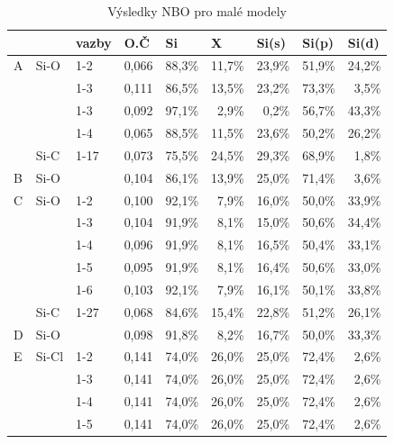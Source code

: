\documentclass[
  digital, %
  table,   %
  lof,     %
  lot,     %
  oneside,
]{fithesis3}
\begin{document}
\begin{table}[htbp]
\caption{Výsledky NBO pro malé modely}
\begin{center}
  \begin{tabular}{|l|l|l|r|r|r|r|r|r|}
  \hline
   &  & vazby & \multicolumn{1}{l|}{O.Č} & \multicolumn{1}{l|}{Si} & \multicolumn{1}{l|}{X} & \multicolumn{1}{l|}{Si(s)} & \multicolumn{1}{l|}{Si(p)} & \multicolumn{1}{l|}{Si(d)} \\ \hline
  A & Si-O & 1-2  & 0,066 & 88,3\% & 11,7\% & 23,9\% & 51,9\% & 24,2\% \\ \hline
   &  & 1-3 & 0,111 & 86,5\% & 13,5\% & 23,2\% & 73,3\% & 3,5\% \\ \hline
   &  & 1-3 & 0,092 & 97,1\% & 2,9\% & 0,2\% & 56,7\% & 43,3\% \\ \hline
   &  & 1-4 & 0,065 & 88,5\% & 11,5\% & 23,6\% & 50,2\% & 26,2\% \\ \hline
   & Si-C & 1-17 & 0,073 & 75,5\% & 24,5\% & 29,3\% & 68,9\% & 1,8\% \\ \hline
  B & Si-O &  & 0,104 & 86,1\% & 13,9\% & 25,0\% & 71,4\% & 3,6\% \\ \hline
  C & Si-O & 1-2  & 0,100 & 92,1\% & 7,9\% & 16,0\% & 50,0\% & 33,9\% \\ \hline
   &  & 1-3 & 0,104 & 91,9\% & 8,1\% & 15,0\% & 50,6\% & 34,4\% \\ \hline
   &  & 1-4 & 0,096 & 91,9\% & 8,1\% & 16,5\% & 50,4\% & 33,1\% \\ \hline
   &  & 1-5 & 0,095 & 91,9\% & 8,1\% & 16,4\% & 50,6\% & 33,0\% \\ \hline
   &  & 1-6 & 0,103 & 92,1\% & 7,9\% & 16,1\% & 50,1\% & 33,8\% \\ \hline
   & Si-C & 1-27 & 0,068 & 84,6\% & 15,4\% & 22,8\% & 51,2\% & 26,1\% \\ \hline
  D & Si-O &  & 0,098 & 91,8\% & 8,2\% & 16,7\% & 50,0\% & 33,3\% \\ \hline
  E & Si-Cl & 1-2  & 0,141 & 74,0\% & 26,0\% & 25,0\% & 72,4\% & 2,6\% \\ \hline
   &  & 1-3 & 0,141 & 74,0\% & 26,0\% & 25,0\% & 72,4\% & 2,6\% \\ \hline
   &  & 1-4 & 0,141 & 74,0\% & 26,0\% & 25,0\% & 72,4\% & 2,6\% \\ \hline
   &  & 1-5 & 0,141 & 74,0\% & 26,0\% & 25,0\% & 72,4\% & 2,6\% \\ \hline
  \end{tabular}
\end{center}
\label{nbo_small}
\end{table}
\end{document}
